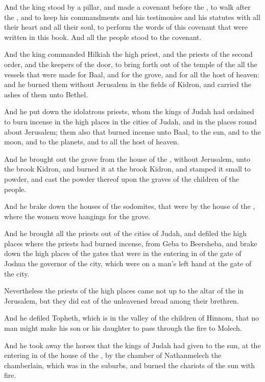 \Verse And the king stood by a pillar, and made a covenant before the \LORD, to walk after the \LORD, and to keep his commandments and his testimonies and his statutes with all their heart and all their soul, to perform the words of this covenant that were written in this book.  And all the people stood to the covenant.

\Verse And the king commanded Hilkiah the high priest, and the priests of the second order, and the keepers of the door, to bring forth out of the temple of the \LORD all the vessels that were made for Baal, and for the grove, and for all the host of heaven: and he burned them without Jerusalem in the fields of Kidron, and carried the ashes of them unto Bethel.

\Verse And he put down the idolatrous priests, whom the kings of Judah had ordained to burn incense in the high places in the cities of Judah, and in the places round about Jerusalem; them also that burned incense unto Baal, to the sun, and to the moon, and to the planets, and to all the host of heaven.

\Verse And he brought out the grove from the house of the \LORD, without Jerusalem, unto the brook Kidron, and burned it at the brook Kidron, and stamped it small to powder, and cast the powder thereof upon the graves of the children of the people.

\Verse And he brake down the houses of the sodomites, that were by the house of the \LORD, where the women wove hangings for the grove.

\Verse And he brought all the priests out of the cities of Judah, and defiled the high places where the priests had burned incense, from Geba to Beersheba, and brake down the high places of the gates that were in the entering in of the gate of Joshua the governor of the city, which were on a man's left hand at the gate of the city.

\Verse Nevertheless the priests of the high places came not up to the altar of the \LORD in Jerusalem, but they did eat of the unleavened bread among their brethren.

\Verse And he defiled Topheth, which is in the valley of the children of Hinnom, that no man might make his son or his daughter to pass through the fire to Molech.

\Verse And he took away the horses that the kings of Judah had given to the sun, at the entering in of the house of the \LORD, by the chamber of Nathanmelech the chamberlain, which was in the suburbs, and burned the chariots of the sun with fire.

